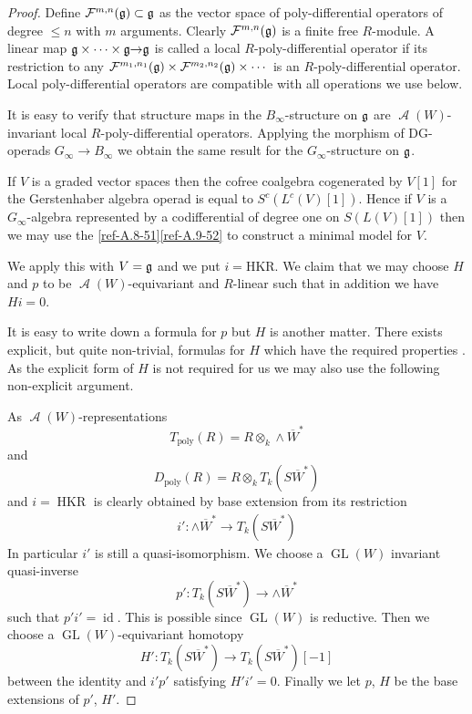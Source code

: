 \documentclass{amsart}
\numberwithin{equation}{section}
\let\cal\mathcal
\theoremstyle{definition}
\theoremstyle{remark}
\begin{document}
\begin{proof}
Define ${{\cal F}}^{m,n}(\frak{g})\subset \frak{g}$ as the vector space of
poly-differential operators of degree $\le n$ with
$m$ arguments. Clearly ${{\cal F}}^{m,n}(\frak{g})$ is a finite free
$R$-module. A linear map $\frak{g}\times\cdots\times \frak{g}{\rightarrow}
\frak{g}$ is called a local $R$-poly-differential operator if its restriction
to any ${{\cal F}}^{m_1,n_1}(\frak{g})\times {{\cal F}}^{m_2,n_2}(\frak{g})\times \cdots$
is an $R$-poly-differential operator. Local poly-differential operators
are compatible with all operations we use below. 

\medskip

It is easy to verify that structure maps in the $B_\infty$-structure
on $\frak{g}$ are ${\operatorname{{\cal A}}}(W)$-invariant local $R$-poly-differential
operators.
Applying the morphism of DG-operads $G_\infty\rightarrow B_\infty$ we obtain 
 the same result for the $G_\infty$-structure on $\frak{g}$.

\medskip

If $V$ is a graded vector spaces then the cofree coalgebra cogenerated
by $V[1]$ for the Gerstenhaber algebra operad is equal to
$S^c(L^c(V)[1])$.  Hence if $V$ is a $G_\infty$-algebra represented by a
codifferential of degree one on $S(L(V)[1])$ then we may use the
\eqref{ref-A.8-51}\eqref{ref-A.9-52} to construct a minimal model for
$V$.

We apply this with $V=\frak{g}$ and we put
$i=\text{HKR}$. We claim that we may choose
$H$ and $p$ to be ${\operatorname{{\cal A}}}(W)$-equivariant and $R$-linear such that in addition
we have $Hi=0$.

It is easy to write down a formula for $p$ but $H$ is another matter.
There exists explicit, but quite non-trivial, formulas for $H$ which
have the required properties \cite{Halbout1,dWL}. As the
explicit form of $H$ is not required for us we may also use the following
non-explicit argument.

As ${\operatorname{{\cal A}}}(W)$-representations
\[
T_{\operatorname{poly}}(R)=R\otimes_k \wedge\overline{W}^\ast
\]
and 
\[
D_{\operatorname{poly}}(R)=R\otimes_k T_k(S\overline{W}^\ast)
\]
and $i=\operatorname{HKR}$ is clearly obtained by base extension from its
restriction
\begin{gather*}
i':\wedge \overline{W}^\ast\rightarrow T_k(S\overline{W}^\ast)
\end{gather*}
In particular $i'$ is still a quasi-isomorphism.
We choose a ${\operatorname {GL}}(W)$ invariant quasi-inverse 
\[
p': T_k(S\overline{W}^\ast){\rightarrow}\wedge \overline{W}^\ast
\]
such that $p'i'={\operatorname{id}}$. This is possible since ${\operatorname {GL}}(W)$ is reductive. Then we choose a
${\operatorname {GL}}(W)$-equivariant homotopy
\[
H':T_k(S\overline{W}^\ast)\rightarrow T_k(S\overline{W}^\ast)[-1]
\]
between the identity and $i'p'$ satisfying $H'i'=0$. Finally we let $p$, $H$ be the base extensions
of $p'$, $H'$. 


\end{proof}
\end{document}
